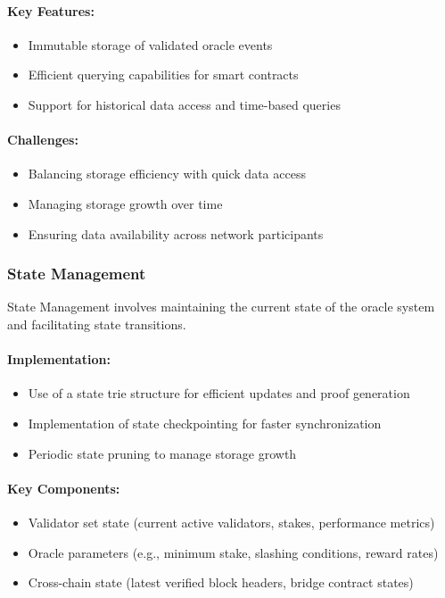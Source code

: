 \documentclass[12pt,a4paper]{article}
\begin{document}
	\paragraph{Key Features:}
	\begin{itemize}
		\item Immutable storage of validated oracle events
		\item Efficient querying capabilities for smart contracts
		\item Support for historical data access and time-based queries
	\end{itemize}
	
	\paragraph{Challenges:}
	\begin{itemize}
		\item Balancing storage efficiency with quick data access
		\item Managing storage growth over time
		\item Ensuring data availability across network participants
	\end{itemize}
	
	\subsubsection{State Management}
	State Management involves maintaining the current state of the oracle system and facilitating state transitions.
	
	\paragraph{Implementation:}
	\begin{itemize}
		\item Use of a state trie structure for efficient updates and proof generation
		\item Implementation of state checkpointing for faster synchronization
		\item Periodic state pruning to manage storage growth
	\end{itemize}
	
	\paragraph{Key Components:}
	\begin{itemize}
		\item Validator set state (current active validators, stakes, performance metrics)
		\item Oracle parameters (e.g., minimum stake, slashing conditions, reward rates)
		\item Cross-chain state (latest verified block headers, bridge contract states)
	\end{itemize}
	
\end{document}

